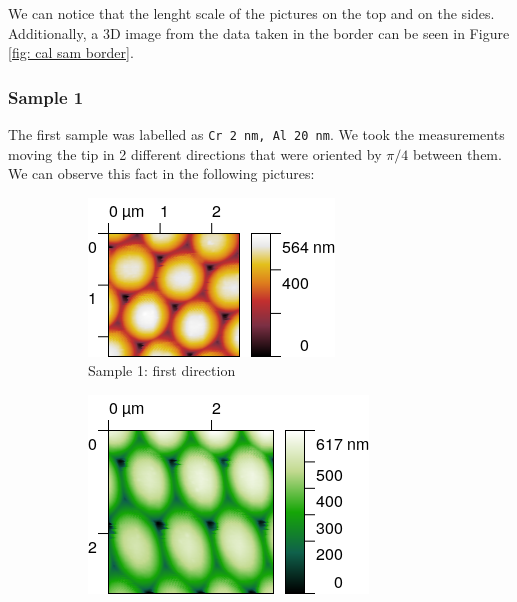 \documentclass[11pt,a4paper]{article}
\begin{document}
We can notice that the lenght scale of the pictures on the top and on the sides. Additionally, a 3D image from the data taken in the border can be seen in Figure \ref{fig: cal sam border}.

\subsubsection{Sample 1}
The first sample was labelled as \texttt{Cr \SI{2}{\nano m}, Al \SI{20}{\nano m}}. {\color{red}We took the measurements moving the tip in 2 different directions that were oriented by $\pi /4$ between them}. We can observe this fact in the following pictures:

\begin{figure}[H]
\centering
\begin{subfigure}[b]{0.45\textwidth}
\includegraphics[width=\textwidth]{sm_sample1}
\caption{Sample 1: first direction}
\label{fig:}
\end{subfigure}
\begin{subfigure}[b]{0.45\textwidth}
\includegraphics[width=\textwidth]{sm_sample1_dir2}

\end{subfigure}
\end{figure}
\end{document}
